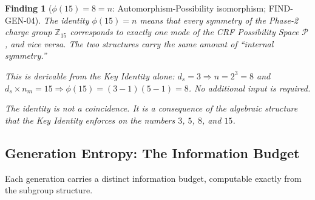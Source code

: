 \documentclass[12pt, a4paper]{article}
\newtheorem{finding}{Finding}[section]
\begin{document}
\begin{finding}[$\phi(15) = 8 = n$: Automorphism-Possibility
  isomorphism; FIND-GEN-04]
\label{zc15:find:phi15}
The identity $\phi(15) = n$ means that every symmetry of the
Phase-2 charge group $\mathbb{Z}_{15}$ corresponds to exactly
one mode of the CRF Possibility Space $\mathcal{P}$, and vice
versa. The two structures carry the same amount of
``internal symmetry.''

This is derivable from the Key Identity alone:
$d_s = 3 \Rightarrow n = 2^3 = 8$ and
$d_s \times n_m = 15 \Rightarrow \phi(15) = (3-1)(5-1) = 8$.
No additional input is required.

The identity is not a coincidence. It is a consequence of the
algebraic structure that the Key Identity enforces on the
numbers $3$, $5$, $8$, and $15$.
\end{finding}

\subsection{Generation Entropy: The Information Budget}
\label{zc15:sec:entropy}

Each generation carries a distinct information budget, computable
exactly from the subgroup structure.
\end{document}
